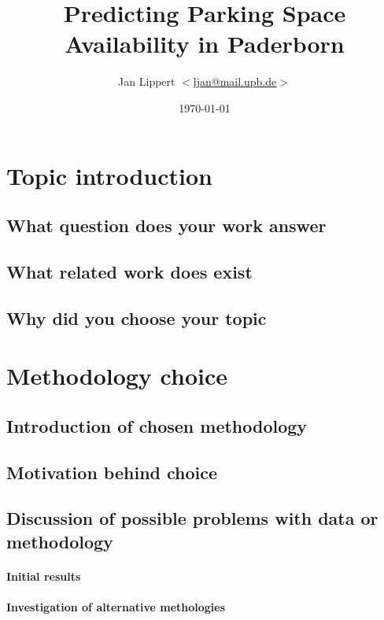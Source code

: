 \documentclass[journal,10pt]{IEEEtran}
\author{Jan Lippert \(<\)\href{mailt:ljan@mail.upb.de}{ljan@mail.upb.de}\(>\)}
\date{\today}
\begin{document}
\title{Predicting Parking Space Availability in Paderborn}
\maketitle


\cite{bigml}

\section{Topic introduction}

\subsection{What question does your work answer}

\subsection{What related work does exist}

\subsection{Why did you choose your topic}



\section{Methodology choice}

\subsection{Introduction of chosen methodology}

\subsection{Motivation behind choice}

\subsection{Discussion of possible problems with data or methodology}
\paragraph{Initial results}
\paragraph{Investigation of alternative methologies}
\end{document}
